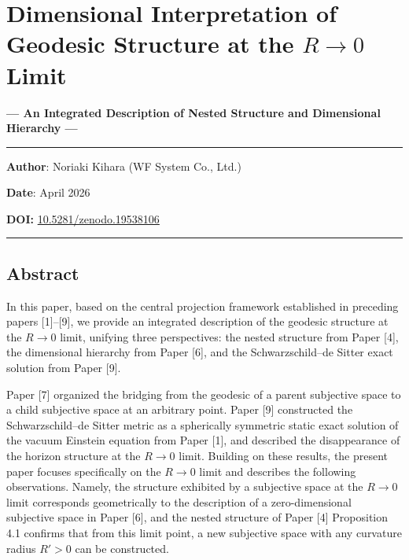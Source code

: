 \documentclass[a4paper,11pt]{article}
\theoremstyle{definition}
\begin{document}
\section{\texorpdfstring{Dimensional Interpretation of Geodesic
Structure at the \(R \to 0\)
Limit}{Dimensional Interpretation of Geodesic Structure at the R \textbackslash to 0 Limit}}\label{dimensional-interpretation-of-geodesic-structure-at-the-r-to-0-limit}

\textbf{--- An Integrated Description of Nested Structure and
Dimensional Hierarchy ---}

\begin{center}\rule{0.5\linewidth}{0.5pt}\end{center}

\textbf{Author}: Noriaki Kihara (WF System Co., Ltd.)

\textbf{Date}: April 2026

\textbf{DOI:}
\href{https://doi.org/10.5281/zenodo.19538106}{10.5281/zenodo.19538106}

\begin{center}\rule{0.5\linewidth}{0.5pt}\end{center}

\subsection{Abstract}\label{abstract}

In this paper, based on the central projection framework established in
preceding papers {[}1{]}--{[}9{]}, we provide an integrated description
of the geodesic structure at the \(R \to 0\) limit, unifying three
perspectives: the nested structure from Paper {[}4{]}, the dimensional
hierarchy from Paper {[}6{]}, and the Schwarzschild--de Sitter exact
solution from Paper {[}9{]}.

Paper {[}7{]} organized the bridging from the geodesic of a parent
subjective space to a child subjective space at an arbitrary point.
Paper {[}9{]} constructed the Schwarzschild--de Sitter metric as a
spherically symmetric static exact solution of the vacuum Einstein
equation from Paper {[}1{]}, and described the disappearance of the
horizon structure at the \(R \to 0\) limit. Building on these results,
the present paper focuses specifically on the \(R \to 0\) limit and
describes the following observations. Namely, the structure exhibited by
a subjective space at the \(R \to 0\) limit corresponds geometrically to
the description of a zero-dimensional subjective space in Paper {[}6{]},
and the nested structure of Paper {[}4{]} Proposition 4.1 confirms that
from this limit point, a new subjective space with any curvature radius
\(R' > 0\) can be constructed.
\end{document}
